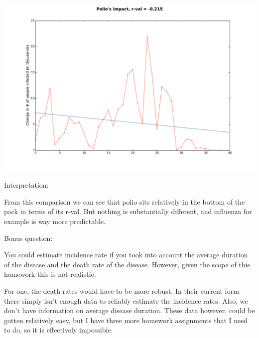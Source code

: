 \documentclass[]{article}
\begin{document}
\begin{enumerate}
\centerline{\includegraphics[scale = 0.4]{figures/polioChange.pdf}}

{\large Interpretation:}

From this comparison we can see that polio sits relatively in the bottom of the pack in terms of its r-val. But nothing is substantially different, and influenza for example is way more predictable. 
\end{enumerate}

\vspace{2em}
{\large Bonus question:}

You could estimate incidence rate if you took into account the average duration of the disease and the death rate of the disease. However, given the scope of this homework this is not realistic. 

\vspace{1em}

For one, the death rates would have to be more robust. In their current form there simply isn't enough data to reliably estimate the incidence rates. Also, we don't have information on average disease duration. These data however, could be gotten relatively easy, but I have three more homework assignments that I need to do, so it is effectively impossible. 
\end{document}
